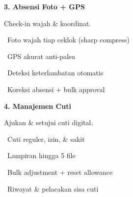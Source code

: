 \documentclass[a4paper]{article}
\begin{document}
\vspace{8pt}

\noindent
\begin{minipage}[t]{0.485\textwidth}
    \colorbox{PurplePrimary}{%
        \begin{minipage}{\dimexpr\textwidth-2\fboxsep\relax}
            {\fontsize{10}{13}\selectfont\bfseries\color{White} 3. Absensi Foto + GPS}
        \end{minipage}}\par
    \vspace{4pt}
    {\fontsize{9}{12}\selectfont\color{TextDark}%
    Check-in wajah \& koordinat.\par\vspace{3pt}
    \textbullet\ Foto wajah tiap ceklok (sharp compress)\par\vspace{2pt}%
    \textbullet\ GPS akurat anti-palsu\par\vspace{2pt}%
    \textbullet\ Deteksi keterlambatan otomatis\par\vspace{2pt}%
    \textbullet\ Koreksi absensi + bulk approval}%

\end{minipage}%
\hfill
\begin{minipage}[t]{0.485\textwidth}
    \colorbox{BlueDark}{%
        \begin{minipage}{\dimexpr\textwidth-2\fboxsep\relax}
            {\fontsize{10}{13}\selectfont\bfseries\color{White} 4. Manajemen Cuti}
        \end{minipage}}\par
    \vspace{4pt}
    {\fontsize{9}{12}\selectfont\color{TextDark}%
    Ajukan \& setujui cuti digital.\par\vspace{3pt}
    \textbullet\ Cuti reguler, izin, \& sakit\par\vspace{2pt}%
    \textbullet\ Lampiran hingga 5 file\par\vspace{2pt}%
    \textbullet\ Bulk adjustment + reset allowance\par\vspace{2pt}%
    \textbullet\ Riwayat \& pelacakan sisa cuti}%

\end{minipage}

\vspace{8pt}
\end{document}
